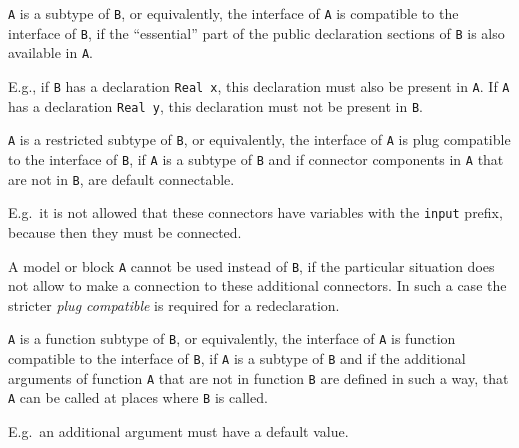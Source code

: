 \begin{definition}
\lstinline!A! is a subtype of \lstinline!B!, or equivalently, the interface of \lstinline!A! is compatible to the interface of \lstinline!B!, if the ``essential'' part of the public declaration
sections of \lstinline!B! is also available in \lstinline!A!.
\par
\begin{nonnormative*}
E.g., if \lstinline!B! has a declaration \lstinline!Real x!, this declaration must also be present in \lstinline!A!.  If \lstinline!A! has a declaration \lstinline!Real y!, this declaration must
not be present in \lstinline!B!.
\end{nonnormative*}
\end{definition}

\begin{definition}
\lstinline!A! is a restricted subtype of \lstinline!B!, or equivalently, the interface of \lstinline!A! is plug compatible to the interface of \lstinline!B!, if \lstinline!A! is a subtype of
\lstinline!B! and if connector components in \lstinline!A! that are not in \lstinline!B!, are default connectable.
\begin{nonnormative}
E.g.\ it is not allowed that these connectors have variables with the \lstinline!input! prefix, because then they must be connected.
\end{nonnormative}
A model or block \lstinline!A! cannot be used instead of \lstinline!B!, if the particular situation does not allow to make a connection to these additional connectors. In such a case the stricter
\emph{plug compatible} is required for a redeclaration.
\end{definition}

\begin{definition}
\lstinline!A! is a function subtype of \lstinline!B!, or equivalently, the interface of \lstinline!A! is function compatible to the interface of \lstinline!B!, if \lstinline!A! is a subtype of
\lstinline!B! and if the additional arguments of function \lstinline!A! that are not in function \lstinline!B! are defined in such a way, that \lstinline!A! can be called at places where
\lstinline!B! is called.
\par
\begin{nonnormative*}
E.g.\ an additional argument must have a default value.
\end{nonnormative*}
\end{definition}


